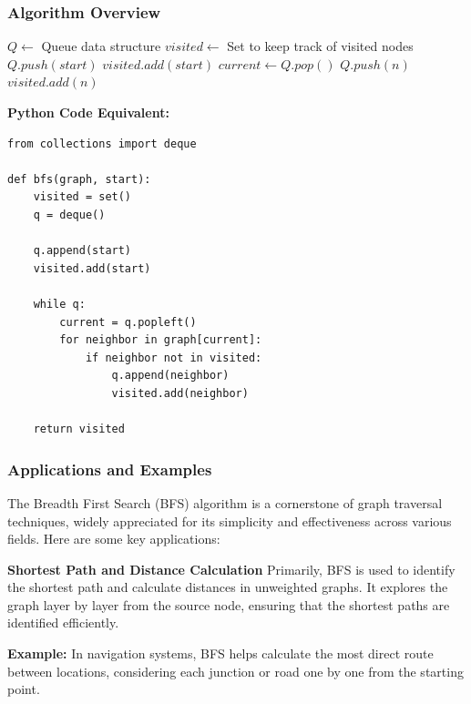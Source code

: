 \documentclass[12pt]{book} %
\begin{document}
\subsubsection{Algorithm Overview}


\FloatBarrier
\begin{algorithm}
\caption{Breadth-First Search (BFS)}
\begin{algorithmic}
\State $Q \gets$ Queue data structure
\State $visited \gets$ Set to keep track of visited nodes
\State $Q.push(start)$ 
\State $visited.add(start)$
    \State $current \gets Q.pop()$
            \State $Q.push(n)$
            \State $visited.add(n)$
        \EndIf
    \EndFor
\EndWhile
\end{algorithmic}
\end{algorithm}
\FloatBarrier
\textbf{Python Code Equivalent:}
\FloatBarrier

\begin{lstlisting}
from collections import deque

def bfs(graph, start):
    visited = set()
    q = deque()
    
    q.append(start)
    visited.add(start)
    
    while q:
        current = q.popleft()
        for neighbor in graph[current]:
            if neighbor not in visited:
                q.append(neighbor)
                visited.add(neighbor)
    
    return visited
\end{lstlisting}
\FloatBarrier

\subsubsection{Applications and Examples}

The Breadth First Search (BFS) algorithm is a cornerstone of graph traversal techniques, widely appreciated for its simplicity and effectiveness across various fields. Here are some key applications:

\textbf{Shortest Path and Distance Calculation}
Primarily, BFS is used to identify the shortest path and calculate distances in unweighted graphs. It explores the graph layer by layer from the source node, ensuring that the shortest paths are identified efficiently.

\textbf{Example:} In navigation systems, BFS helps calculate the most direct route between locations, considering each junction or road one by one from the starting point.
\end{document}
